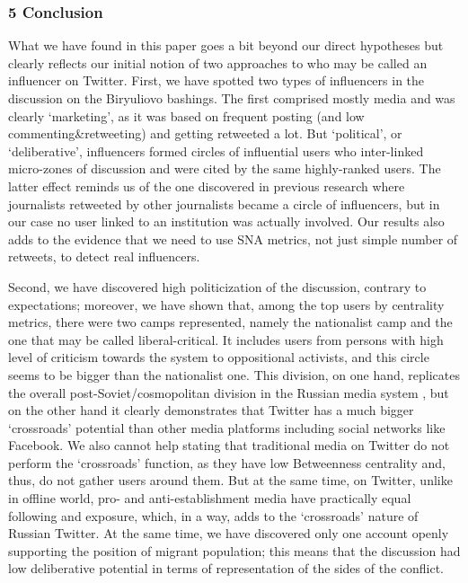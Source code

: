 \subsubsection{5 Conclusion}
What we have found in this paper goes a bit beyond our direct hypotheses but clearly reflects our initial notion of two approaches to who may be called an influencer on Twitter.
First, we have spotted two types of influencers in the discussion on the Biryuliovo bashings. The first comprised mostly media and was clearly ‘marketing’, as it was based on frequent posting (and low commenting\&retweeting) and getting retweeted a lot. But ‘political’, or ‘deliberative’, influencers formed circles of influential users who inter-linked micro-zones of discussion and were cited by the same highly-ranked users. The latter effect reminds us of the one discovered in previous research where journalists retweeted by other journalists became a circle of influencers, but in our case no user linked to an institution was actually involved. Our results also adds to the evidence that we need to use SNA metrics, not just simple number of retweets, to detect real influencers.

Second, we have discovered high politicization of the discussion, contrary to expectations; moreover, we have shown that, among the top users by centrality metrics, there were two camps represented, namely the nationalist camp and the one that may be called liberal-critical. It includes users from persons with high level of criticism towards the system to oppositional activists, and this circle seems to be bigger than the nationalist one. This division, on one hand, replicates the overall post-Soviet/cosmopolitan division in the Russian media system \cite{BodrunovaLitvinenkoYakunin,BodrunovaLitvinenkoGavraYakunin}, but on the other hand it clearly demonstrates that Twitter has a much bigger ‘crossroads’ potential than other media platforms including social networks like Facebook. We also cannot help stating that traditional media on Twitter do not perform the ‘crossroads’ function, as they have low Betweenness centrality and, thus, do not gather users around them. But at the same time, on Twitter, unlike in offline world, pro- and anti-establishment media have practically equal following and exposure, which, in a way, adds to the ‘crossroads’ nature of Russian Twitter. At the same time, we have discovered only one account openly supporting the position of migrant population; this means that the discussion had low deliberative potential in terms of representation of the sides of the conflict.

